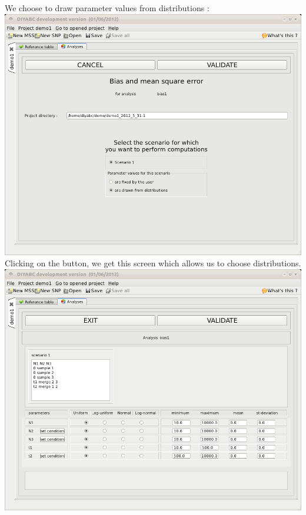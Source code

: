 We choose to draw parameter values from distributions :\\

\includegraphics[scale=0.35]{gui_pictures/Capture-DIYABC-45.png} \\

Clicking on the  button, we get this screen which allows us to choose distributions. \\

\includegraphics[scale=0.35]{gui_pictures/Capture-DIYABC-46.png} \\

